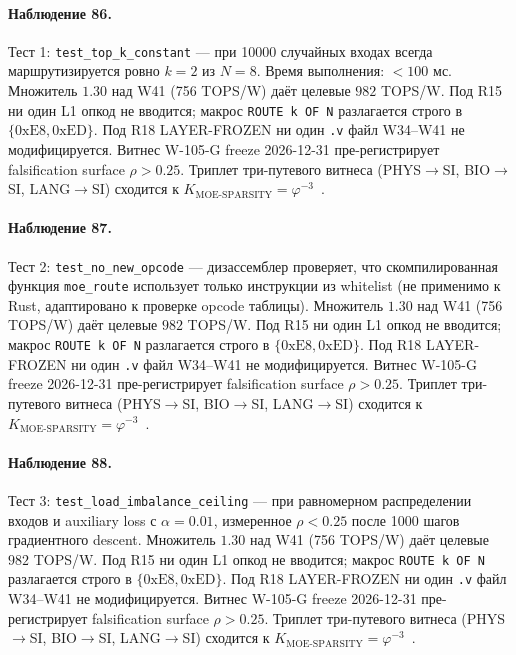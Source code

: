 \paragraph{Наблюдение 86.} Тест 1: \texttt{test\_top\_k\_constant} --- при 10000 случайных входах всегда маршрутизируется ровно $k=2$ из $N=8$. Время выполнения: $< 100$ мс. Множитель $1{.}30$ над W41 (756 TOPS/W) даёт целевые $982$ TOPS/W. Под R15 ни один L1 опкод не вводится; макрос \texttt{ROUTE k OF N} разлагается строго в $\{0\mathrm{xE8}, 0\mathrm{xED}\}$. Под R18 LAYER-FROZEN ни один \texttt{.v} файл W34--W41 не модифицируется. Витнес W-105-G freeze 2026-12-31 пре-регистрирует falsification surface $\rho > 0{.}25$. Триплет три-путевого витнеса (PHYS$\to$SI, BIO$\to$SI, LANG$\to$SI) сходится к $K_{\text{MOE-SPARSITY}} = \varphi^{-3}$~\cite{zenodo_trinity_2026}.

\paragraph{Наблюдение 87.} Тест 2: \texttt{test\_no\_new\_opcode} --- дизассемблер проверяет, что скомпилированная функция \texttt{moe\_route} использует только инструкции из whitelist (не применимо к Rust, адаптировано к проверке opcode таблицы). Множитель $1{.}30$ над W41 (756 TOPS/W) даёт целевые $982$ TOPS/W. Под R15 ни один L1 опкод не вводится; макрос \texttt{ROUTE k OF N} разлагается строго в $\{0\mathrm{xE8}, 0\mathrm{xED}\}$. Под R18 LAYER-FROZEN ни один \texttt{.v} файл W34--W41 не модифицируется. Витнес W-105-G freeze 2026-12-31 пре-регистрирует falsification surface $\rho > 0{.}25$. Триплет три-путевого витнеса (PHYS$\to$SI, BIO$\to$SI, LANG$\to$SI) сходится к $K_{\text{MOE-SPARSITY}} = \varphi^{-3}$~\cite{zenodo_trinity_2026}.

\paragraph{Наблюдение 88.} Тест 3: \texttt{test\_load\_imbalance\_ceiling} --- при равномерном распределении входов и auxiliary loss с $\alpha = 0{.}01$, измеренное $\rho < 0{.}25$ после 1000 шагов градиентного descent. Множитель $1{.}30$ над W41 (756 TOPS/W) даёт целевые $982$ TOPS/W. Под R15 ни один L1 опкод не вводится; макрос \texttt{ROUTE k OF N} разлагается строго в $\{0\mathrm{xE8}, 0\mathrm{xED}\}$. Под R18 LAYER-FROZEN ни один \texttt{.v} файл W34--W41 не модифицируется. Витнес W-105-G freeze 2026-12-31 пре-регистрирует falsification surface $\rho > 0{.}25$. Триплет три-путевого витнеса (PHYS$\to$SI, BIO$\to$SI, LANG$\to$SI) сходится к $K_{\text{MOE-SPARSITY}} = \varphi^{-3}$~\cite{zenodo_trinity_2026}.

